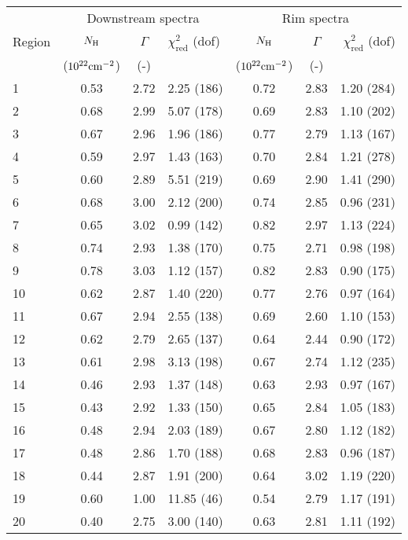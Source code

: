 \begin{tabular}{@{}lcclccr@{}}
\toprule
{} & \multicolumn{3}{c}{Downstream spectra}
   & \multicolumn{3}{c}{Rim spectra} \\
\cmidrule(lr){2-4} \cmidrule(l){5-7}
Region & $N_{\mathrm{H}}$ & $\Gamma$ & $\chi^2_{\mathrm{red}}$ (dof)
       & $N_{\mathrm{H}}$ & $\Gamma$ & $\chi^2_{\mathrm{red}}$ (dof) \\
{} & ($10^{22} \mathrm{cm}^{-2}$) & (-) & {}
   & ($10^{22} \mathrm{cm}^{-2}$) & (-) & {} \\
\midrule
1  & 0.53 & 2.72 & 2.25 (186) & 0.72 & 2.83 & 1.20 (284) \\
2  & 0.68 & 2.99 & 5.07 (178) & 0.69 & 2.83 & 1.10 (202) \\
3  & 0.67 & 2.96 & 1.96 (186) & 0.77 & 2.79 & 1.13 (167) \\
\cmidrule{1-7}
4  & 0.59 & 2.97 & 1.43 (163) & 0.70 & 2.84 & 1.21 (278) \\
5  & 0.60 & 2.89 & 5.51 (219) & 0.69 & 2.90 & 1.41 (290) \\
6  & 0.68 & 3.00 & 2.12 (200) & 0.74 & 2.85 & 0.96 (231) \\
7  & 0.65 & 3.02 & 0.99 (142) & 0.82 & 2.97 & 1.13 (224) \\
8  & 0.74 & 2.93 & 1.38 (170) & 0.75 & 2.71 & 0.98 (198) \\
9  & 0.78 & 3.03 & 1.12 (157) & 0.82 & 2.83 & 0.90 (175) \\
10 & 0.62 & 2.87 & 1.40 (220) & 0.77 & 2.76 & 0.97 (164) \\
\cmidrule{1-7}
11 & 0.67 & 2.94 & 2.55 (138) & 0.69 & 2.60 & 1.10 (153) \\
12 & 0.62 & 2.79 & 2.65 (137) & 0.64 & 2.44 & 0.90 (172) \\
13 & 0.61 & 2.98 & 3.13 (198) & 0.67 & 2.74 & 1.12 (235) \\
\cmidrule{1-7}
14 & 0.46 & 2.93 & 1.37 (148) & 0.63 & 2.93 & 0.97 (167) \\
15 & 0.43 & 2.92 & 1.33 (150) & 0.65 & 2.84 & 1.05 (183) \\
16 & 0.48 & 2.94 & 2.03 (189) & 0.67 & 2.80 & 1.12 (182) \\
17 & 0.48 & 2.86 & 1.70 (188) & 0.68 & 2.83 & 0.96 (187) \\
\cmidrule{1-7}
18 & 0.44 & 2.87 & 1.91 (200) & 0.64 & 3.02 & 1.19 (220) \\
19 & 0.60 & 1.00 & 11.85 (46) & 0.54 & 2.79 & 1.17 (191) \\
20 & 0.40 & 2.75 & 3.00 (140) & 0.63 & 2.81 & 1.11 (192) \\
\bottomrule
\end{tabular}
